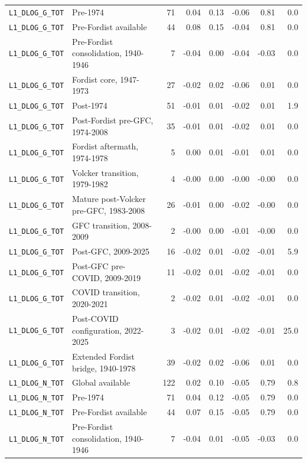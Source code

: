 \begin{landscape}
\begin{longtable}{p{4.4cm}p{3.8cm}rrrrrr}
\\
\nolinkurl{L1_DLOG_G_TOT} & Pre-1974 & 71 & 0.04 & 0.13 & -0.06 & 0.81 & 0.0
\\
\nolinkurl{L1_DLOG_G_TOT} & Pre-Fordist available & 44 & 0.08 & 0.15 & -0.04 & 0.81 & 0.0
\\
\nolinkurl{L1_DLOG_G_TOT} & Pre-Fordist consolidation, 1940-1946 & 7 & -0.04 & 0.00 & -0.04 & -0.03 & 0.0
\\
\nolinkurl{L1_DLOG_G_TOT} & Fordist core, 1947-1973 & 27 & -0.02 & 0.02 & -0.06 & 0.01 & 0.0
\\
\nolinkurl{L1_DLOG_G_TOT} & Post-1974 & 51 & -0.01 & 0.01 & -0.02 & 0.01 & 1.9
\\
\nolinkurl{L1_DLOG_G_TOT} & Post-Fordist pre-GFC, 1974-2008 & 35 & -0.01 & 0.01 & -0.02 & 0.01 & 0.0
\\
\nolinkurl{L1_DLOG_G_TOT} & Fordist aftermath, 1974-1978 & 5 & 0.00 & 0.01 & -0.01 & 0.01 & 0.0
\\
\nolinkurl{L1_DLOG_G_TOT} & Volcker transition, 1979-1982 & 4 & -0.00 & 0.00 & -0.00 & -0.00 & 0.0
\\
\nolinkurl{L1_DLOG_G_TOT} & Mature post-Volcker pre-GFC, 1983-2008 & 26 & -0.01 & 0.00 & -0.02 & -0.00 & 0.0
\\
\nolinkurl{L1_DLOG_G_TOT} & GFC transition, 2008-2009 & 2 & -0.00 & 0.00 & -0.01 & -0.00 & 0.0
\\
\nolinkurl{L1_DLOG_G_TOT} & Post-GFC, 2009-2025 & 16 & -0.02 & 0.01 & -0.02 & -0.01 & 5.9
\\
\nolinkurl{L1_DLOG_G_TOT} & Post-GFC pre-COVID, 2009-2019 & 11 & -0.02 & 0.01 & -0.02 & -0.01 & 0.0
\\
\nolinkurl{L1_DLOG_G_TOT} & COVID transition, 2020-2021 & 2 & -0.02 & 0.01 & -0.02 & -0.01 & 0.0
\\
\nolinkurl{L1_DLOG_G_TOT} & Post-COVID configuration, 2022-2025 & 3 & -0.02 & 0.01 & -0.02 & -0.01 & 25.0
\\
\nolinkurl{L1_DLOG_G_TOT} & Extended Fordist bridge, 1940-1978 & 39 & -0.02 & 0.02 & -0.06 & 0.01 & 0.0
\\
\nolinkurl{L1_DLOG_N_TOT} & Global available & 122 & 0.02 & 0.10 & -0.05 & 0.79 & 0.8
\\
\nolinkurl{L1_DLOG_N_TOT} & Pre-1974 & 71 & 0.04 & 0.12 & -0.05 & 0.79 & 0.0
\\
\nolinkurl{L1_DLOG_N_TOT} & Pre-Fordist available & 44 & 0.07 & 0.15 & -0.05 & 0.79 & 0.0
\\
\nolinkurl{L1_DLOG_N_TOT} & Pre-Fordist consolidation, 1940-1946 & 7 & -0.04 & 0.01 & -0.05 & -0.03 & 0.0

\end{longtable}
\end{landscape}
